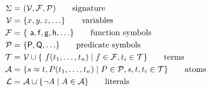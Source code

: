 \begin{notation}
	\vspace{-1em}
\begin{align*}
 \Sigma = &\ (\SIGV, \SIGF, \SIGP) 						
 \tag*{signature}
 \\
 \SIGV = &\ \{x,y,z,\ldots\}									
 \tag*{variables}
 \\
 \SIGF = &\ \{ \ma,\mf,\mg,\mh,\ldots \}			
 \tag*{function symbols}
 \\
 \SIGP = &\ \{ \mP, \mQ, \ldots\}																			
 \tag*{predicate symbols} 
 \\
 \SIGT = &\ \SIGV \cup \{ f(t_1,\ldots,t_n)\mid f\in\SIGF, t_i \in \SIGT \}			
 \tag*{terms}
 \\
\SIGA = &\ \{ s\foEQ t, P ( t_1, \ldots, t_n )\mid P\in\SIGP, s,t,t_i \in \SIGT\}
\tag*{atoms}
\\
\SIGL = &\ \SIGA \cup \{ \lnot A \mid A\in \SIGA \}
\tag*{literals}
\\
\end{align*}
\end{notation}



